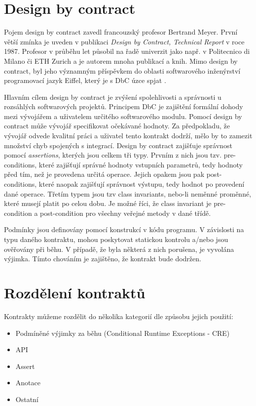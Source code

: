 	\section{Design by contract}
		Pojem design by contract zavedl francouzský profesor Bertrand Meyer. První větší zmínka je uveden v publikaci \emph{Design by Contract, Technical Report} v roce 1987. Profesor v průběhu let působil na řadě univerzit jako např. v Politecnico di Milano či ETH Zurich a je autorem mnoha publikací a knih. Mimo design by contract, byl jeho významným příspěvkem do oblasti softwarového inženýrství programovací jazyk Eiffel, který je s DbC úzce spjat \cite{meyerBio}\cite{DesignByContractComponentware}\cite{eiffel}.	
	
		Hlavním cílem design by contract je zvýšení spolehlivosti a správnosti u rozsáhlých softwarových projektů. Principem DbC je zajištění formální dohody mezi vývojářem a uživatelem určitého softwarového modulu. Pomocí design by contract může vývojář specifikovat očekávané hodnoty. Za předpokladu, že vývojář odvede kvalitní práci a uživatel tento kontrakt dodrží, mělo by to zamezit množství chyb spojených s integrací. Design by contract zajišťuje správnost pomocí \emph{assertions}, kterých jsou celkem tři typy. Prvním z nich jsou tzv. pre-conditions, které zajišťují správné hodnoty vstupních parametrů, tedy hodnoty před tím, než je provedena určitá operace. Jejich opakem jsou pak post-conditions, které naopak zajišťují správnost výstupu, tedy hodnot po provedení dané operace. Třetím typem jsou tzv class invariants, nebo-li neměnné proměnné, které musejí platit po celou dobu. Je možné říci, že class invariant je pre-condition a post-condition pro všechny veřejné metody v dané třídě.
	
	Podmínky jsou definovány pomocí konstrukcí v kódu programu. V závislosti na typu daného kontraktu, mohou poskytovat statickou kontrolu a/nebo jsou ověřovány při běhu. V případě, že byla některá z nich porušena, je vyvolána výjimka. Tímto chováním je zajištěno, že kontrakt bude dodržen.
	
	\section{Rozdělení kontraktů}
		Kontrakty můžeme rozdělit do několika kategorií dle způsobu jejich použití:
			
		\begin{itemize}
			\item Podmíněné výjimky za běhu (Conditional Runtime Exceptions - CRE)
			\item API
			\item Assert
			\item Anotace
			\item Ostatní
		\end{itemize}				
		
